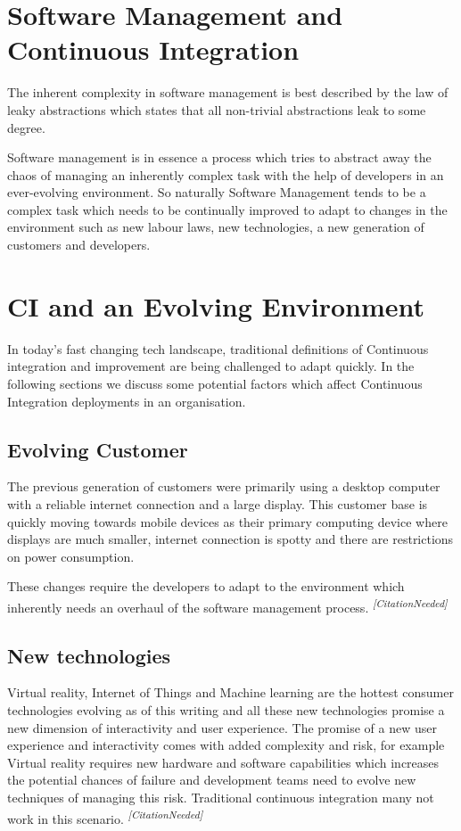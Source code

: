 \documentclass[10pt,conference]{IEEEtran}
\newcommand{\citationneeded}{\textsuperscript{\textit{[CitationNeeded]}}}
\begin{document}
\section*{Software Management and Continuous Integration}

The inherent complexity in software management is best described by the law of leaky abstractions \cite{spolsky_law_2002} which states that all non-trivial abstractions leak to some degree. 

Software management is in essence a process which tries to abstract away the chaos of managing an inherently complex task with the help of developers in an ever-evolving environment. So naturally Software Management tends to be a complex task which needs to be continually improved to adapt to changes in the environment such as new labour laws, new technologies, a new generation of customers and developers. 

\section*{CI and an Evolving Environment}

In today's fast changing tech landscape, traditional definitions of Continuous integration and improvement are being challenged to adapt quickly. In the following sections we discuss some potential factors which affect Continuous Integration deployments in an organisation.

\subsection*{Evolving Customer}
The previous generation of customers were primarily using a desktop computer with a reliable internet connection and a large display. This customer base is quickly moving towards mobile devices as their primary computing device where displays are much smaller, internet connection is spotty and there are restrictions on power consumption. 

These changes require the developers to adapt to the environment which inherently needs an overhaul of the software management process. \citationneeded


\subsection*{New technologies}

Virtual reality, Internet of Things and Machine learning are the hottest consumer technologies evolving as of this writing and all these new technologies promise a new dimension of interactivity and user experience. The promise of a new user experience and interactivity comes with added complexity and risk, for example Virtual reality requires new hardware and software capabilities which increases the potential chances of failure and development teams need to evolve new techniques of managing this risk. Traditional continuous integration many not work in this scenario. \citationneeded
\end{document}
